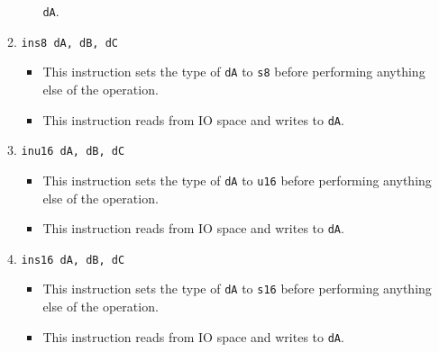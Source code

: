 \documentclass{article}
\begin{document}
\begin{itemize}
\begin{enumerate}
\begin{itemize}
					\texttt{dA}.
				\end{itemize}
			\item \texttt{ins8 dA, dB, dC}
				\begin{itemize}
				\item This instruction sets the type of \texttt{dA} to
					\texttt{s8} before performing anything else of the
					operation.
				\item This instruction reads from IO space and writes to
					\texttt{dA}.
				\end{itemize}
			\item \texttt{inu16 dA, dB, dC}
				\begin{itemize}
				\item This instruction sets the type of \texttt{dA} to
					\texttt{u16} before performing anything else of the
					operation.
				\item This instruction reads from IO space and writes to
					\texttt{dA}.
				\end{itemize}
			\item \texttt{ins16 dA, dB, dC}
				\begin{itemize}
				\item This instruction sets the type of \texttt{dA} to
					\texttt{s16} before performing anything else of the
					operation.
				\item This instruction reads from IO space and writes to
					\texttt{dA}.
				\end{itemize}


\end{enumerate}
\end{itemize}
\end{document}
